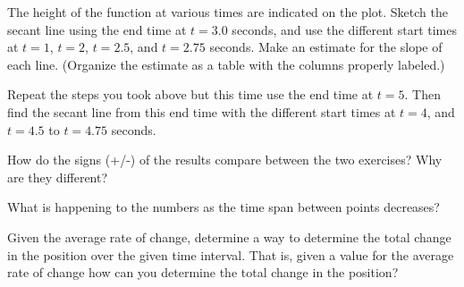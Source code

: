 \begin{problem}
    \begin{subproblem}
    \item The height of the function at various times are indicated on
      the plot. Sketch the secant line using the end time at $t=3.0$
      seconds, and use the different start times at $t=1$, $t=2$,
      $t=2.5$, and $t=2.75$ seconds. Make an estimate for the slope of
      each line. (Organize the estimate as a table with the columns
      properly labeled.)

      \vfill
      \clearpage

    \item Repeat the steps you took above but this time use the end
      time at $t=5$. Then find the secant line from this end time with
      the different start times at $t=4$, and $t=4.5$ to $t=4.75$
      seconds.

      \scalebox{0.5}{}
    
      \vfill

      \clearpage
      
    \item How do the signs (+/-) of the results compare between the
      two exercises? Why are they different?  

      \vfill
    
    \item What is happening to the numbers as the time span between
      points decreases?

      \vfill

    \item Given the average rate of change, determine a way to
      determine the total change in the position over the given time
      interval. That is, given a value for the average rate of change
      how can you determine the total change in the position?

      \vfill

    \end{subproblem}

\end{problem}


\postClass

